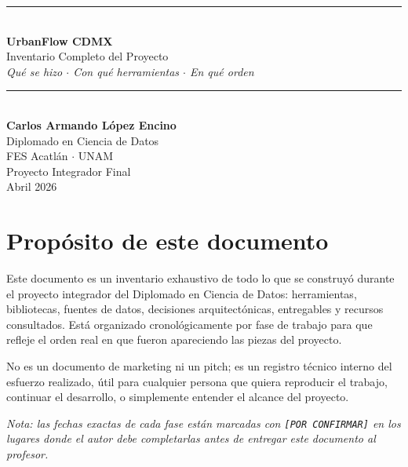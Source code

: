 \documentclass[11pt,a4paper]{article}
\begin{document}
\begin{titlepage}
\centering
\vspace*{3cm}

{\color{navy}\rule{\textwidth}{1.2pt}}\\[0.8em]
{\Huge\bfseries\color{navy} UrbanFlow CDMX}\\[0.5em]
{\Large\color{navy} Inventario Completo del Proyecto}\\[0.3em]
{\large\itshape\color{amber} Qué se hizo \(\cdot\) Con qué herramientas \(\cdot\) En qué orden}\\[0.3em]
{\color{navy}\rule{\textwidth}{1.2pt}}\\[3cm]

{\Large\bfseries Carlos Armando López Encino}\\[0.4em]
{\large Diplomado en Ciencia de Datos}\\[0.2em]
{\large FES Acatlán \(\cdot\) UNAM}\\[1.5cm]

{\large Proyecto Integrador Final}\\[0.3em]
{\large Abril 2026}

\vfill
\end{titlepage}

\section*{Propósito de este documento}

Este documento es un inventario exhaustivo de todo lo que se construyó durante el proyecto integrador del Diplomado en Ciencia de Datos: herramientas, bibliotecas, fuentes de datos, decisiones arquitectónicas, entregables y recursos consultados. Está organizado cronológicamente por fase de trabajo para que refleje el orden real en que fueron apareciendo las piezas del proyecto.

No es un documento de marketing ni un pitch; es un registro técnico interno del esfuerzo realizado, útil para cualquier persona que quiera reproducir el trabajo, continuar el desarrollo, o simplemente entender el alcance del proyecto.

\textit{Nota: las fechas exactas de cada fase están marcadas con \texttt{[POR CONFIRMAR]} en los lugares donde el autor debe completarlas antes de entregar este documento al profesor.}

\end{document}
